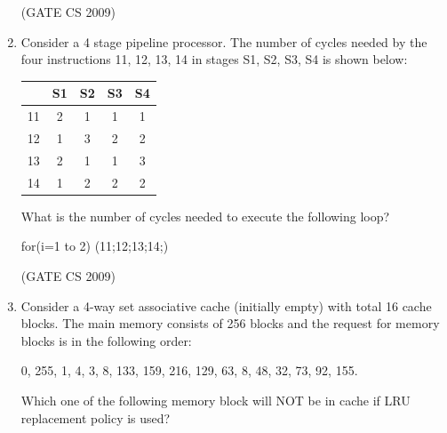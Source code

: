 \documentclass[a4paper, 11pt]{article}
\begin{document}
\begin{enumerate}
        \hfill (GATE CS 2009)

    \item Consider a 4 stage pipeline processor. The number of cycles needed by the four instructions 11, 12, 13, 14 in stages S1, S2, S3, S4 is shown below:\\
    \begin{center}
        \begin{tabular}{|c|c|c|c|c|}
    \hline
           & S1  & S2 & S3 & S4 \\
        \hline
        11  & 2  & 1 & 1 & 1 \\
        \hline
        12  & 1  & 3 & 2 & 2 \\
        \hline
        13  & 2  & 1 & 1 & 3 \\
        \hline
        14  & 1  & 2 & 2 & 2 \\
        \hline
    \end{tabular}
    \end{center}
    

        What is the number of cycles needed to execute the following loop?\\
        \begin{center}
        for(i=1 to 2) (11;12;13;14;)\\
        \end{center}
        \begin{enumerate}
        \end{enumerate}

    \hfill (GATE CS 2009)

    \item Consider a 4-way set associative cache (initially empty) with total 16 cache blocks. The main memory consists of 256 blocks and the request for memory blocks is in the following order:
    
    \begin{center}
        0, 255, 1, 4, 3, 8, 133, 159, 216, 129, 63, 8, 48, 32, 73, 92, 155.\\
    \end{center}
    
    Which one of the following memory block will NOT be in cache if LRU replacement policy is used?
        \begin{enumerate}
        \end{enumerate}


\end{enumerate}
\end{document}
